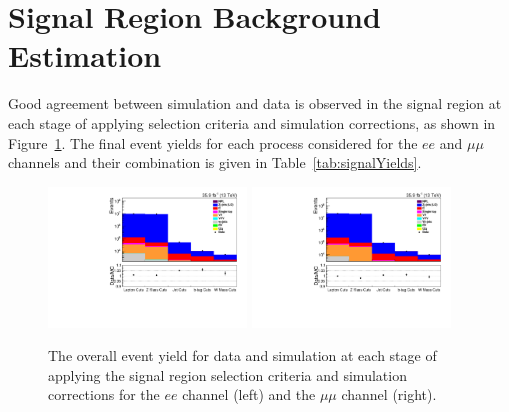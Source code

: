 \section{Signal Region Background Estimation}\label{sec:simBackgrounds}

Good agreement between simulation and data is observed in the signal region at each stage of applying selection criteria and simulation corrections, as shown in Figure~\ref{fig:SR_cutFlow}.
The final event yields for each process considered for the $ee$ and $\mu\mu$ channels and their combination is given in Table~\ref{tab:signalYields}.

\begin{figure}[h]
\centering
\includegraphics[width=0.47\textwidth]{figs/background-estimation/plots/unblinded/prompt_ee_ttbarInc/cutFlow_log.pdf}
\includegraphics[width=0.47\textwidth]{figs/background-estimation/plots/unblinded/prompt_mumu_ttbarInc/cutFlow_log.pdf}
\caption{
The overall event yield for data and simulation at each stage of applying the signal region selection criteria and simulation corrections for the $ee$ channel (left) and the $\mu\mu$ channel (right).
}
\label{fig:SR_cutFlow}
\end{figure}

